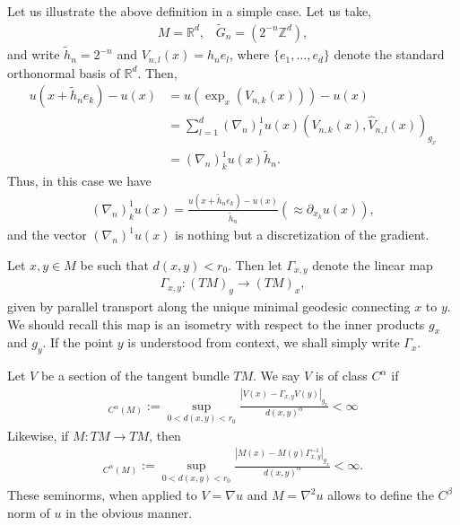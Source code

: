 \documentclass[11pt,reqno]{amsart}
\numberwithin{equation}{section}
\theoremstyle{plain}
\begin{document}
\begin{rem}\label{remAppendix: Discrete Gradient Eucliean Case}
  Let us illustrate the above definition in a simple case. Let us take,
  \begin{align*}
    M=\mathbb{R}^d,\;\;\; \tilde G_n = (2^{-n}\mathbb{Z}^d),
  \end{align*}	
  and write $\tilde h_n = 2^{-n}$ and $V_{n,l}(x) = h_ne_l$, where $\{e_1,\ldots,e_d\}$ denote the standard orthonormal basis of $\mathbb{R}^d$. Then,
  \begin{align*}
    u(x+\tilde h_ne_k)-u(x) & = u(\exp_{x}(V_{n,k}(x)))-u(x)\\
      & = \sum \limits_{l=1}^{d} (\nabla_n)_l^1u(x) (V_{n,k}(x),\hat V_{n,l}(x))_{g_x}\\
      & = (\nabla_n)^1_ku(x) \tilde h_n.   
  \end{align*}
  Thus, in this case we have
  \begin{align*}
    (\nabla_n)^1_ku(x) = \frac{u(x+\tilde h_ne_k)-u(x)}{\tilde h_n} (\approx \partial_{x_k}u(x)),	  
  \end{align*}	  
  and the vector $(\nabla_n)^1u(x)$ is nothing but a discretization of the gradient.
\end{rem}



\begin{DEF}\label{def:Appendix Parallel Transport}
  Let $x,y \in M$ be such that $d(x,y)<r_0$. Then let $\Gamma_{x,y}$ denote the linear map
  \begin{align*}
    \Gamma_{x,y}: (TM)_y \to (TM)_x,
  \end{align*}
  given by parallel transport along the unique minimal geodesic connecting $x$ to $y$. We should recall this map is an isometry with respect to the inner products $g_x$ and $g_{y}$. If the point $y$ is understood from context, we shall simply write $\Gamma_x$.
  
\end{DEF}

\begin{DEF}  Let $V$ be a section of the tangent bundle $TM$. We say $V$ is of class $C^\alpha$ if
  \begin{align*} 
    [V]_{C^\alpha(M)} :=\sup \limits_{0<d(x,y)<r_0}\frac{|V(x)-\Gamma_{x,y}V(y)|_{g_x}}{d(x,y)^\alpha} < \infty
  \end{align*}
  Likewise, if $M:TM\to TM$, then
  \begin{align*}
    [M]_{C^\alpha(M)} := \sup \limits_{0<d(x,y)<r_0}\frac{|M(x)-M(y)\Gamma_{x,y}^{-1}|_{g_x}}{d(x,y)^\alpha}<\infty.
  \end{align*}
  These seminorms, when applied to $V=\nabla u$ and $M=\nabla^2u$ allows to define the $C^\beta$ norm of $u$ in the obvious manner.
\end{DEF}
\end{document}
